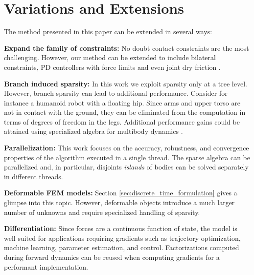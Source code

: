 \section{Variations and Extensions}
\label{sec:variations_and_extensions}

The method presented in this paper can be extended in several ways:

\textbf{Expand the family of constraints:} No doubt contact constraints are the most challenging. However, our method can be extended to include bilateral constraints, PD controllers with force limits and even joint dry friction \cite{bib:todorov2014}.

\textbf{Branch induced sparsity:} In this work we exploit sparsity only at a tree level. However, branch sparsity can lead to additional performance. Consider for instance a humanoid robot with a floating hip. Since arms and upper torso are not in contact with the ground, they can be eliminated from the computation in terms of degrees of freedom in the legs. Additional performance gains could be attained using specialized algebra for multibody dynamics \cite{bib:carpentier2021}.

\textbf{Parallelization:} This work focuses on the accuracy, robustness, and convergence properties of the algorithm executed in a single thread. The sparse algebra can be parallelized and, in particular, disjoints \emph{islands} of bodies can be solved separately in different threads.

\textbf{Deformable FEM models:} Section \ref{sec:discrete_time_formulation} gives a glimpse into this topic. However, deformable objects introduce a much larger number of unknowns and require specialized handling of sparsity.

\textbf{Differentiation:} Since forces are a continuous function of state, the model is well suited for applications requiring gradients such as trajectory optimization, machine learning, parameter estimation, and control. Factorizations computed during forward dynamics can be reused when computing gradients for a performant implementation.

